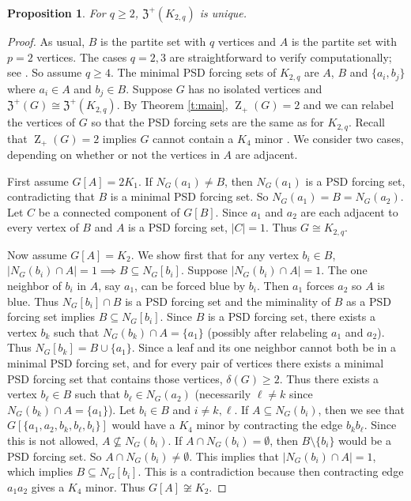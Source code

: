 \documentclass{article}
\numberwithin{figure}{section}
\numberwithin{table}{section}
\numberwithin{equation}{section}
\newtheorem{prop}[thm]{Proposition}
\theoremstyle{definition}
\theoremstyle{definition}
\theoremstyle{definition}
\newcommand{\bpf}{\begin{proof}}
\newcommand{\epf}{\end{proof}\ms}
\newcommand{\ms}{\medskip}
\newcommand{\Zp}{\operatorname{Z}_+}
\newcommand{\zptar}{\mathfrak{Z}^+}%
\begin{document}
{  \begin{prop}\label{p:Kab-unique-PSD}
For $q\ge 2$, $\zptar(K_{2,q})$ is unique.
\end{prop}
\bpf
 As usual,  $B$ is the partite set with $q$ vertices and  $A$ is the partite set with $p=2$ vertices. The cases $q=2, 3$ are straightforward to verify computationally; see \cite{sage:recon}. So assume $q\ge 4$. The minimal PSD forcing sets of $K_{2,q}$ are $A$, $B$ and $\{a_i,b_j\}$ where $a_i\in A$ and $b_j\in B$. 
Suppose $G$ has no isolated vertices and  $\zptar(G)\cong \zptar(K_{2,q})$.
By Theorem \ref{t:main}, $\Zp(G)=2$ and we can relabel the vertices of $G$ so that the PSD forcing sets are the same as for $K_{2,q}$. Recall that $\Zp(G)=2$ implies $G$ cannot contain a $K_4$ minor \cite{EGR11}.
We consider two cases, depending on whether or not the vertices in $A$ are adjacent.  

First  assume  $G[A]=2K_1$.
If $N_G(a_1)\ne B$, then $N_G(a_1)$ is a PSD forcing set, contradicting that $B$ is a minimal PSD forcing set.  So $N_G(a_1)=B=N_G(a_2)$.  Let $C$ be a connected component of $G[B]$.  Since $a_1$ and $a_2$ are each adjacent to every vertex of $B$ and $A$ is a PSD forcing set, $|C|=1$.  Thus $G\cong K_{2,q}$.

Now assume $G[A]=K_2$. 
 We show first that for any vertex $b_i\in B$,
$|N_G(b_i)\cap A|=1 \implies B\subseteq N_G[b_i]$. 
Suppose $|N_G(b_i)\cap A|=1$. The one neighbor of $b_i$ in $A$, say  $a_1$, can be  forced blue by $b_i$.  Then $a_1$ forces $a_2$ so $A$ is blue.  Thus $N_G[b_i]\cap B$ is a PSD forcing set and the miminality of $B$ as a PSD forcing set implies  $B\subseteq N_G[b_i]$.
Since $B$ is a PSD forcing set, there exists a vertex $b_k$ such that  $N_G(b_k)\cap A=\{a_1\}$   %
 (possibly after relabeling $a_1$ and $a_2$). 
 Thus $N_G[b_k]=B\cup \{a_1\}$.  Since a leaf and its one neighbor cannot both be in a minimal PSD forcing set, and  for every pair of vertices there exists a minimal PSD forcing set that contains those vertices, 
 $\delta(G)\ge 2$.  
 Thus there exists a vertex $b_\ell\in B$ such that $b_\ell\in N_G(a_2)$  (necessarily $\ell\ne k$ since $N_G(b_k)\cap A=\{a_1\}$).  Let $b_i\in B$ and $i\ne k,\ell$. If  $A\subseteq N_G(b_i)$, then we see that $G[\{a_1,a_2,b_k,b_\ell,b_i\}]$ would have a $K_4$ minor   by contracting  the edge $b_kb_{\ell}$. 
 Since this is not allowed, $A\not\subseteq N_G(b_i)$.  If $A\cap N_G(b_i)=\emptyset$, then $B\setminus  \{b_i\} $  would be a  PSD forcing set.  So  $A\cap N_G(b_i)\ne \emptyset$.  This implies that $|N_G(b_i)\cap A|=1$,  which implies $B\subseteq  N_G[b_i]$. 
 This is a contradiction because then contracting edge $a_1a_2$ gives a $K_4$ minor.  Thus $G[A]\not\cong K_2$.
\epf 





}
\end{document}
